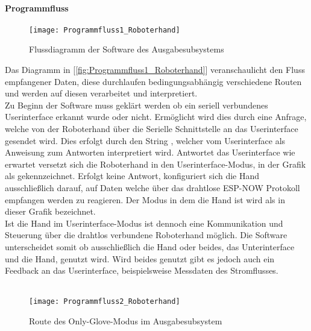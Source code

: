 \documentclass[titlepage,12pt,twoside]{article}
\begin{document}
\paragraph{Programmfluss}
\hfill \break
\hfill \break
\begin{figure}[H]
	\begin{center}
		\scalebox{1.2}
		{\texttt{[image: Programmfluss1\_Roboterhand]}}
		\caption{Flussdiagramm der Software des Ausgabesubsystems}
		\label{fig:Programmfluss1_Roboterhand}		
	\end{center}
\end{figure}
\hfill \break
Das Diagramm in [\textcolor{blue}{\autoref{fig:Programmfluss1_Roboterhand}}] veranschaulicht den Fluss empfangener Daten, diese durchlaufen bedingungsabhängig verschiedene Routen und 
werden auf diesen verarbeitet und interpretiert.
\\
Zu Beginn der Software muss geklärt werden ob ein seriell verbundenes Userinterface erkannt wurde oder nicht. Ermöglicht wird dies durch eine Anfrage, 
welche von der Roboterhand über die Serielle Schnittstelle an das Userinterface gesendet wird. Dies erfolgt durch den String , welcher vom Userinterface als Anweisung zum Antworten 
interpretiert wird. Antwortet das Userinterface wie erwartet versetzt sich die Roboterhand in den Userinterface-Modus, in der Grafik als  
gekennzeichnet. Erfolgt keine Antwort, konfiguriert sich die Hand ausschließlich darauf, auf Daten welche über das drahtlose ESP-NOW Protokoll empfangen 
werden zu reagieren. Der Modus in dem die Hand ist wird als  in dieser Grafik bezeichnet. \\
Ist die Hand im Userinterface-Modus ist dennoch eine Kommunikation und Steuerung über die drahtlos verbundene Roboterhand möglich. Die Software 
unterscheidet somit ob ausschließlich die Hand oder beides, das Unterinterface und die Hand, genutzt wird. Wird beides genutzt gibt es jedoch auch ein 
Feedback an das Userinterface, beispielsweise Messdaten des Stromflusses. \\
\\
\begin{figure}[H]
	\begin{center}
		\scalebox{0.4}
		{\texttt{[image: Programmfluss2\_Roboterhand]}}
		\caption{Route des Only-Glove-Modus im Ausgabesubsystem}
		\label{fig:Programmfluss2_Roboterhand}		
	\end{center}
\end{figure}
\end{document}

